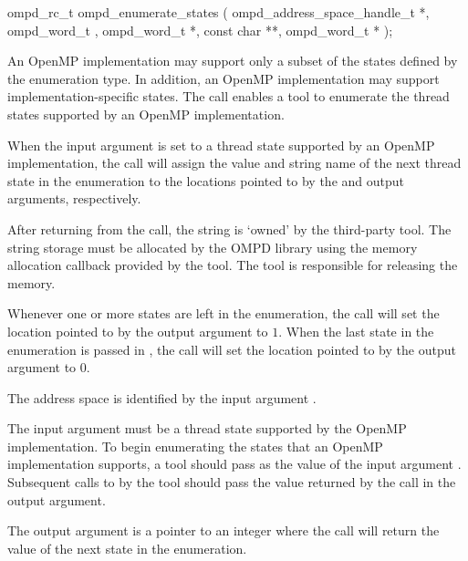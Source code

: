 \format
\begin{cspecific}
\begin{ompSyntax}
ompd_rc_t ompd_enumerate_states (
  ompd_address_space_handle_t *,
  ompd_word_t ,
  ompd_word_t *,
  const char **,
  ompd_word_t *
);
\end{ompSyntax}
\end{cspecific}

\descr
An OpenMP implementation may support only a subset of the states defined by
the  enumeration type. In addition, an
OpenMP implementation may support implementation-specific states.
The  call enables a tool to
enumerate the thread states supported by an OpenMP implementation.

When the  input argument is set to a 
thread state supported by an OpenMP implementation,
the call will assign the value and string name of the next thread state in the enumeration
to the locations pointed to by the 
 and  output arguments, respectively.

After returning from the call, the string  is `owned' by the 
third-party tool.
The string storage must be allocated by the OMPD library using the memory allocation 
callback provided by the tool.
The tool is responsible for releasing the memory.

Whenever one or more states are left in the enumeration,
the call will set the location pointed to by the  
output argument to $1$.
When the last state in the enumeration is passed in , 
the call will set the location pointed to by the  output
argument to $0$.


\argdesc

The address space is identified by the input argument .

The input argument  must be a thread state
supported by the OpenMP implementation.  To begin enumerating the
states that an OpenMP implementation supports, a tool should pass
 as the value of the input argument .  Subsequent
calls to  by the tool should pass the
value returned by the call in the  output argument.

The output argument  is a pointer to an integer where
the call will return the value of the next state in the
enumeration.

